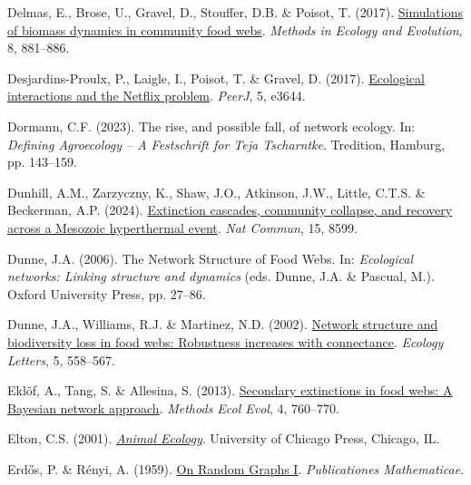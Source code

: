 \documentclass[
]{article}
\newlength{\cslhangindent}
\newenvironment{CSLReferences}[2] %
 {\begin{list}{}{%
  \setlength{\itemindent}{0pt}
  \setlength{\leftmargin}{0pt}
  \setlength{\parsep}{0pt}
  \ifodd #1
   \setlength{\leftmargin}{\cslhangindent}
   \setlength{\itemindent}{-1\cslhangindent}
  \fi
  \setlength{\itemsep}{#2\baselineskip}}}
 {\end{list}}
\begin{document}
\begin{CSLReferences}{1}{0}
Delmas, E., Brose, U., Gravel, D., Stouffer, D.B. \& Poisot, T. (2017).
\href{https://doi.org/10.1111/2041-210X.12713}{Simulations of biomass
dynamics in community food webs}. \emph{Methods in Ecology and
Evolution}, 8, 881--886.

Desjardins-Proulx, P., Laigle, I., Poisot, T. \& Gravel, D. (2017).
\href{https://doi.org/10.7717/peerj.3644}{Ecological interactions and
the {Netflix} problem}. \emph{PeerJ}, 5, e3644.

Dormann, C.F. (2023). The rise, and possible fall, of network ecology.
In: \emph{Defining {Agroecology} -- {A Festschrift} for {Teja
Tscharntke}}. Tredition, Hamburg, pp. 143--159.

Dunhill, A.M., Zarzyczny, K., Shaw, J.O., Atkinson, J.W., Little, C.T.S.
\& Beckerman, A.P. (2024).
\href{https://doi.org/10.1038/s41467-024-53000-2}{Extinction cascades,
community collapse, and recovery across a {Mesozoic} hyperthermal
event}. \emph{Nat Commun}, 15, 8599.

Dunne, J.A. (2006). The {Network Structure} of {Food Webs}. In:
\emph{Ecological networks: {Linking} structure and dynamics} (eds.
Dunne, J.A. \& Pascual, M.). Oxford University Press, pp. 27--86.

Dunne, J.A., Williams, R.J. \& Martinez, N.D. (2002).
\href{https://doi.org/10.1046/j.1461-0248.2002.00354.x}{Network
structure and biodiversity loss in food webs: Robustness increases with
connectance}. \emph{Ecology Letters}, 5, 558--567.

Eklöf, A., Tang, S. \& Allesina, S. (2013).
\href{https://doi.org/10.1111/2041-210X.12062}{Secondary extinctions in
food webs: A {Bayesian} network approach}. \emph{Methods Ecol Evol}, 4,
760--770.

Elton, C.S. (2001).
\emph{\href{https://press.uchicago.edu/ucp/books/book/chicago/A/bo25281897.html}{Animal
{Ecology}}}. University of Chicago Press, Chicago, IL.

Erdős, P. \& Rényi, A. (1959).
\href{https://doi.org/10.5486/PMD.1959.6.3-4.12}{On {Random Graphs I}}.
\emph{Publicationes Mathematicae}.


\end{CSLReferences}
\end{document}
